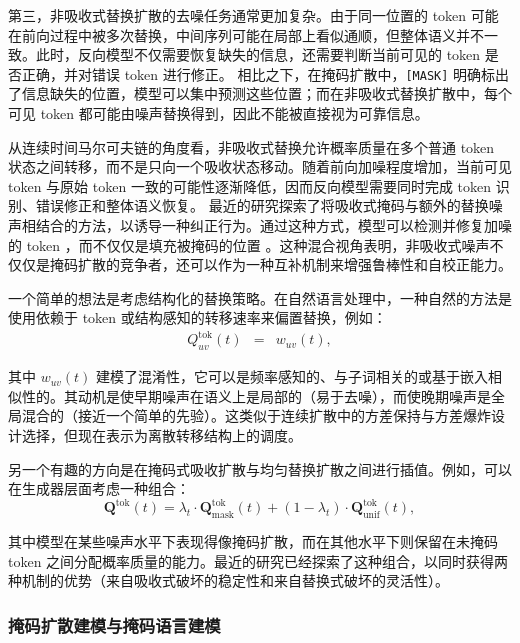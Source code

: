 第三，非吸收式替换扩散的去噪任务通常更加复杂。由于同一位置的 token 可能在前向过程中被多次替换，中间序列可能在局部上看似通顺，但整体语义并不一致。此时，反向模型不仅需要恢复缺失的信息，还需要判断当前可见的 token 是否正确，并对错误 token 进行修正。
相比之下，在掩码扩散中，\texttt{[MASK]} 明确标出了信息缺失的位置，模型可以集中预测这些位置；而在非吸收式替换扩散中，每个可见 token 都可能由噪声替换得到，因此不能被直接视为可靠信息。

从连续时间马尔可夫链的角度看，非吸收式替换允许概率质量在多个普通 token 状态之间转移，而不是只向一个吸收状态移动。随着前向加噪程度增加，当前可见 token 与原始 token 一致的可能性逐渐降低，因而反向模型需要同时完成 token 识别、错误修正和整体语义恢复。
最近的研究探索了将吸收式掩码与额外的替换噪声相结合的方法，以诱导一种纠正行为。通过这种方式，模型可以检测并修复加噪的 token ，而不仅仅是填充被掩码的位置 \citep{zhang-etal:2025corrective,rutte-etal:2025generalized}。这种混合视角表明，非吸收式噪声不仅仅是掩码扩散的竞争者，还可以作为一种互补机制来增强鲁棒性和自校正能力。

一个简单的想法是考虑结构化的替换策略。在自然语言处理中，一种自然的方法是使用依赖于 token 或结构感知的转移速率来偏置替换，例如：
\begin{eqnarray}
Q^{\mathrm{tok}}_{uv}(t) & = & w_{uv}(t),
\end{eqnarray}

\noindent 其中 $w_{uv}(t)$ 建模了混淆性，它可以是频率感知的、与子词相关的或基于嵌入相似性的。其动机是使早期噪声在语义上是局部的（易于去噪），而使晚期噪声是全局混合的（接近一个简单的先验）。这类似于连续扩散中的方差保持与方差爆炸设计选择，但现在表示为离散转移结构上的调度。

另一个有趣的方向是在掩码式吸收扩散与均匀替换扩散之间进行插值。例如，可以在生成器层面考虑一种组合：
\begin{equation}
\mathbf{Q}^{\mathrm{tok}}(t) = \lambda_t \cdot \mathbf{Q}_{\text{mask}}^{\mathrm{tok}}(t) + (1-\lambda_t) \cdot \mathbf{Q}_{\text{unif}}^{\mathrm{tok}}(t),
\end{equation}

\noindent 其中模型在某些噪声水平下表现得像掩码扩散，而在其他水平下则保留在未掩码 token 之间分配概率质量的能力。最近的研究已经探索了这种组合，以同时获得两种机制的优势（来自吸收式破坏的稳定性和来自替换式破坏的灵活性）。
\subsubsection{掩码扩散建模与掩码语言建模}

